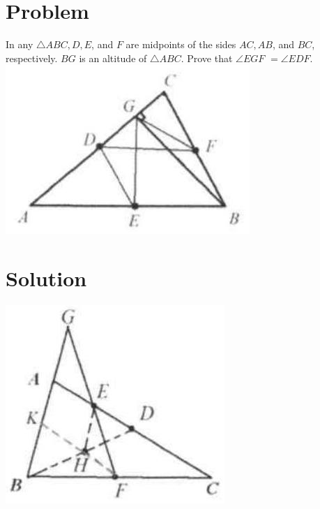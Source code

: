 \documentclass{article}
\begin{document}
\section*{Problem}
In any \(\triangle A B C, D, E\), and \(F\) are midpoints of the sides \(A C, A B\), and \(B C\), respectively. \(B G\) is an altitude of \(\triangle A B C\). Prove that \(\angle E G F\) \(=\angle E D F\).\\
\centering
\includegraphics[width=\textwidth]{images/045.jpg}

\section*{Solution}
\begin{center}
\includegraphics[width=\textwidth]{images/050.jpg}
\end{center}
\end{document}
